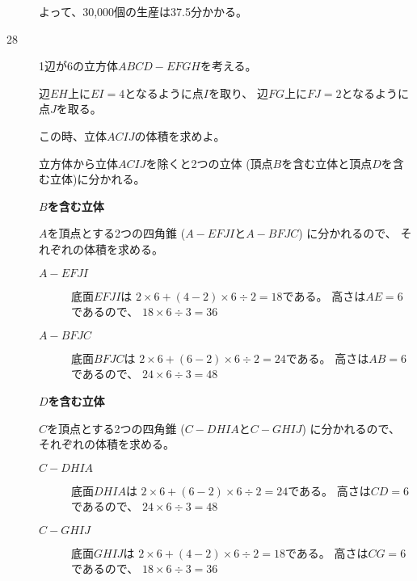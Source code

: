 \documentclass[12pt,b5paper]{ltjsarticle}
\begin{document}
\begin{description}
            よって、30,000個の生産は37.5分かかる。

            \hrulefill

 \item[28]

            1辺が6の立方体$ABCD-EFGH$を考える。

            辺$EH$上に$EI=4$となるように点$I$を取り、
            辺$FG$上に$FJ=2$となるように点$J$を取る。

            この時、立体$ACIJ$の体積を求めよ。

            \dotfill

            立方体から立体$ACIJ$を除くと2つの立体
            (頂点$B$を含む立体と頂点$D$を含む立体)に分かれる。

            \textbf{$B$を含む立体}

            $A$を頂点とする2つの四角錐
            ($A-EFJI$と$A-BFJC$)
            に分かれるので、
            それぞれの体積を求める。

            \begin{description}
             \item[$A-EFJI$]
                        底面$EFJI$は
                        $2\times 6 + (4-2)\times 6 \div 2 = 18$である。
                        高さは$AE=6$であるので、
                        $18\times 6 \div 3 = 36$
             \item[$A-BFJC$]
                        底面$BFJC$は
                        $2\times 6 + (6-2)\times 6 \div 2 = 24$である。
                        高さは$AB=6$であるので、
                        $24\times 6 \div 3 = 48$
            \end{description}

            \textbf{$D$を含む立体}

            $C$を頂点とする2つの四角錐
            ($C-DHIA$と$C-GHIJ$)
            に分かれるので、
            それぞれの体積を求める。

            \begin{description}
             \item[$C-DHIA$]
                        底面$DHIA$は
                        $2\times 6 + (6-2)\times 6 \div 2 = 24$である。
                        高さは$CD=6$であるので、
                        $24\times 6 \div 3 = 48$
             \item[$C-GHIJ$]
                        底面$GHIJ$は
                        $2\times 6 + (4-2)\times 6 \div 2 = 18$である。
                        高さは$CG=6$であるので、
                        $18\times 6 \div 3 = 36$
            \end{description}


\end{description}
\end{document}
